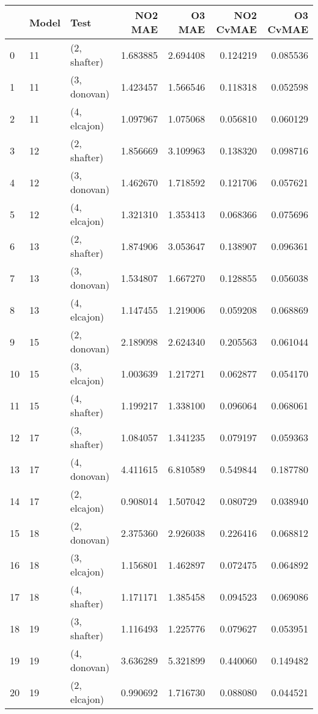 \begin{tabular}{lllrrrr}
\toprule
{} & Model &          Test &   NO2 MAE &    O3 MAE &  NO2 CvMAE &  O3 CvMAE \\
\midrule
0  &    11 &  (2, shafter) &  1.683885 &  2.694408 &   0.124219 &  0.085536 \\
1  &    11 &  (3, donovan) &  1.423457 &  1.566546 &   0.118318 &  0.052598 \\
2  &    11 &  (4, elcajon) &  1.097967 &  1.075068 &   0.056810 &  0.060129 \\
3  &    12 &  (2, shafter) &  1.856669 &  3.109963 &   0.138320 &  0.098716 \\
4  &    12 &  (3, donovan) &  1.462670 &  1.718592 &   0.121706 &  0.057621 \\
5  &    12 &  (4, elcajon) &  1.321310 &  1.353413 &   0.068366 &  0.075696 \\
6  &    13 &  (2, shafter) &  1.874906 &  3.053647 &   0.138907 &  0.096361 \\
7  &    13 &  (3, donovan) &  1.534807 &  1.667270 &   0.128855 &  0.056038 \\
8  &    13 &  (4, elcajon) &  1.147455 &  1.219006 &   0.059208 &  0.068869 \\
9  &    15 &  (2, donovan) &  2.189098 &  2.624340 &   0.205563 &  0.061044 \\
10 &    15 &  (3, elcajon) &  1.003639 &  1.217271 &   0.062877 &  0.054170 \\
11 &    15 &  (4, shafter) &  1.199217 &  1.338100 &   0.096064 &  0.068061 \\
12 &    17 &  (3, shafter) &  1.084057 &  1.341235 &   0.079197 &  0.059363 \\
13 &    17 &  (4, donovan) &  4.411615 &  6.810589 &   0.549844 &  0.187780 \\
14 &    17 &  (2, elcajon) &  0.908014 &  1.507042 &   0.080729 &  0.038940 \\
15 &    18 &  (2, donovan) &  2.375360 &  2.926038 &   0.226416 &  0.068812 \\
16 &    18 &  (3, elcajon) &  1.156801 &  1.462897 &   0.072475 &  0.064892 \\
17 &    18 &  (4, shafter) &  1.171171 &  1.385458 &   0.094523 &  0.069086 \\
18 &    19 &  (3, shafter) &  1.116493 &  1.225776 &   0.079627 &  0.053951 \\
19 &    19 &  (4, donovan) &  3.636289 &  5.321899 &   0.440060 &  0.149482 \\
20 &    19 &  (2, elcajon) &  0.990692 &  1.716730 &   0.088080 &  0.044521 \\

\end{tabular}
